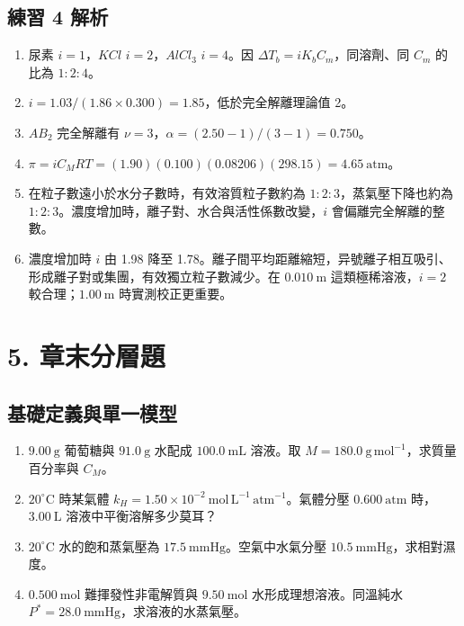 \documentclass[11pt,a4paper]{article}
\providecommand{\tightlist}{%
  \setlength{\itemsep}{0pt}\setlength{\parskip}{0pt}}
\begin{document}
\subsection{練習 4 解析}\label{ux7df4ux7fd2-4-ux89e3ux6790}

\begin{enumerate}
\def\labelenumi{\arabic{enumi}.}
\tightlist
\item
  尿素 \(i=1\)，\(KCl\) \(i=2\)，\(AlCl_3\) \(i=4\)。因 \(\Delta T_b=iK_bC_m\)，同溶劑、同 \(C_m\) 的比為 \(1:2:4\)。
\item
  \(i=1.03/(1.86\times0.300)=1.85\)，低於完全解離理論值 2。
\item
  \(AB_2\) 完全解離有 \(\nu=3\)，\(\alpha=(2.50-1)/(3-1)=0.750\)。
\item
  \(\pi=iC_MRT=(1.90)(0.100)(0.08206)(298.15)=4.65\ \mathrm{atm}\)。
\item
  在粒子數遠小於水分子數時，有效溶質粒子數約為 \(1:2:3\)，蒸氣壓下降也約為 \(1:2:3\)。濃度增加時，離子對、水合與活性係數改變，\(i\) 會偏離完全解離的整數。
\item
  濃度增加時 \(i\) 由 1.98 降至 1.78。離子間平均距離縮短，异號離子相互吸引、形成離子對或集團，有效獨立粒子數減少。在 \(0.010\ \mathrm m\) 這類極稀溶液，\(i=2\) 較合理；\(1.00\ \mathrm m\) 時實測校正更重要。
\end{enumerate}

\section{5. 章末分層題}\label{ux7ae0ux672bux5206ux5c64ux984c}

\subsection{基礎定義與單一模型}\label{ux57faux790eux5b9aux7fa9ux8207ux55aeux4e00ux6a21ux578b}

\begin{enumerate}
\def\labelenumi{\arabic{enumi}.}
\tightlist
\item
  \(9.00\ \mathrm g\) 葡萄糖與 \(91.0\ \mathrm g\) 水配成 \(100.0\ \mathrm{mL}\) 溶液。取 \(M=180.0\ \mathrm{g\,mol^{-1}}\)，求質量百分率與 \(C_M\)。
\item
  \(20^\circ\mathrm C\) 時某氣體 \(k_H=1.50\times10^{-2}\ \mathrm{mol\,L^{-1}\,atm^{-1}}\)。氣體分壓 \(0.600\ \mathrm{atm}\) 時，\(3.00\ \mathrm L\) 溶液中平衡溶解多少莫耳？
\item
  \(20^\circ\mathrm C\) 水的飽和蒸氣壓為 \(17.5\ \mathrm{mmHg}\)。空氣中水氣分壓 \(10.5\ \mathrm{mmHg}\)，求相對濕度。
\item
  \(0.500\ \mathrm{mol}\) 難揮發性非電解質與 \(9.50\ \mathrm{mol}\) 水形成理想溶液。同溫純水 \(P^*=28.0\ \mathrm{mmHg}\)，求溶液的水蒸氣壓。
\end{enumerate}
\end{document}
